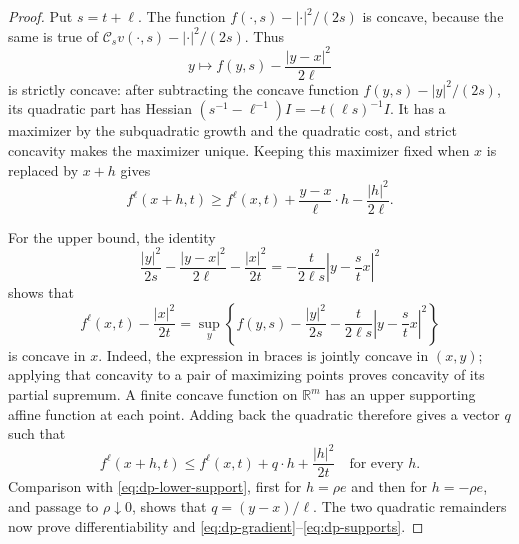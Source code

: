 \documentclass[11pt]{article}
\numberwithin{equation}{section}
\theoremstyle{definition}
\theoremstyle{remark}
\newcommand{\R}{\mathbb{R}}
\newcommand{\Cenv}{\mathcal{C}}
\begin{document}
\begin{proof}
Put $s=t+\ell$.  The function $f(\cdot,s)-|\cdot|^2/(2s)$ is concave,
because the same is true of $\Cenv_s v(\cdot,s)-|\cdot|^2/(2s)$.  Thus
\[
  y\longmapsto f(y,s)-\frac{|y-x|^2}{2\ell}
\]
is strictly concave: after subtracting the concave function
$f(y,s)-|y|^2/(2s)$, its quadratic part has Hessian
$(s^{-1}-\ell^{-1})I=-t(\ell s)^{-1}I$.  It has a maximizer by the
subquadratic growth and the quadratic cost, and strict concavity makes the
maximizer unique.  Keeping this maximizer fixed when $x$ is replaced by
$x+h$ gives
\begin{equation}\label{eq:dp-lower-support}
  f^\ell(x+h,t)\ge f^\ell(x,t)+\frac{y-x}{\ell}\cdot h
                                      -\frac{|h|^2}{2\ell}.
\end{equation}

For the upper bound, the identity
\[
  \frac{|y|^2}{2s}-\frac{|y-x|^2}{2\ell}-\frac{|x|^2}{2t}
  =-\frac{t}{2\ell s}\left|y-\frac{s}{t}x\right|^2
\]
shows that
\[
  f^\ell(x,t)-\frac{|x|^2}{2t}
  =\sup_y\left\{f(y,s)-\frac{|y|^2}{2s}
                  -\frac{t}{2\ell s}\left|y-\frac{s}{t}x\right|^2\right\}
\]
is concave in $x$.  Indeed, the expression in braces is jointly concave in
$(x,y)$; applying that concavity to a pair of maximizing points proves
concavity of its partial supremum.  A finite concave function on $\R^m$ has
an upper supporting affine function at each point.  Adding back the
quadratic therefore gives a vector $q$ such that
\[
  f^\ell(x+h,t)\le f^\ell(x,t)+q\cdot h+\frac{|h|^2}{2t}
  \quad\text{for every }h.
\]
Comparison with \eqref{eq:dp-lower-support}, first for $h=\rho e$ and then
for $h=-\rho e$, and passage to $\rho\downarrow0$, shows that
$q=(y-x)/\ell$.  The two quadratic remainders now prove differentiability
and \eqref{eq:dp-gradient}--\eqref{eq:dp-supports}.
\end{proof}
\end{document}
